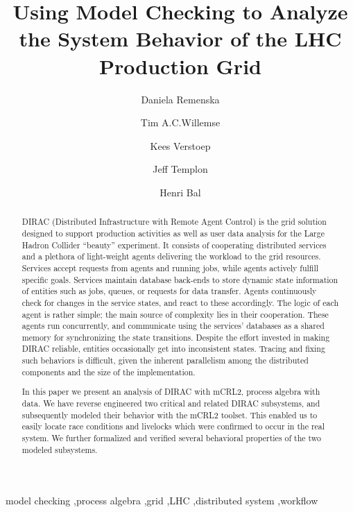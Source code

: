 \documentclass[sort&compress,preprint,3p]{elsarticle}
\begin{document}
\begin{frontmatter}
\title{Using Model Checking to Analyze the System Behavior of the LHC Production Grid}

\author[VU,NIKHEF]{Daniela Remenska}
\author[TUe]{Tim A.C.Willemse}
\author[VU]{Kees Verstoep}
\author[NIKHEF]{Jeff Templon}
\author[VU]{Henri Bal}
\address[VU]{Department of Computer Science, VU University Amsterdam, The Netherlands}
\address[TUe]{Department of Computer Science, TU Eindhoven, The Netherlands}
\address[NIKHEF]{NIKHEF National Institute for High-Energy Physics, Amsterdam, The Netherlands}


\begin{abstract}
DIRAC (Distributed Infrastructure with Remote Agent Control) is the grid
solution designed to support production activities as well as user data analysis
for the Large Hadron Collider ``beauty'' experiment. It consists of cooperating
distributed services and a plethora of light-weight agents delivering the
workload to the grid resources.  Services accept requests from agents and
running jobs, while agents actively fulfill specific goals. Services maintain
database back-ends to store dynamic state information of entities such as jobs,
queues, or requests for data transfer. Agents continuously check for changes in the
service states, and react to these accordingly. The logic of each agent is
rather simple; the main source of complexity lies in their cooperation. These
agents run concurrently, and communicate using the services' databases as a
shared memory for synchronizing the state transitions. Despite the effort
invested in making DIRAC reliable, entities occasionally get into inconsistent
states. Tracing and fixing such behaviors is difficult, given the inherent
parallelism among the distributed components and the size of the
implementation.

In this paper we present an analysis of DIRAC with mCRL2, process algebra with
data. We have reverse engineered two critical and related DIRAC subsystems, and
subsequently modeled their behavior with the mCRL2 toolset. This enabled us to
easily locate race conditions and livelocks which were confirmed to occur in the
real system. We further formalized and verified several behavioral properties of
the two modeled subsystems.
\end{abstract}

\begin{keyword}

model checking \sep process algebra \sep grid \sep LHC \sep distributed system \sep workflow
\end{keyword}

\end{frontmatter}
\end{document}
